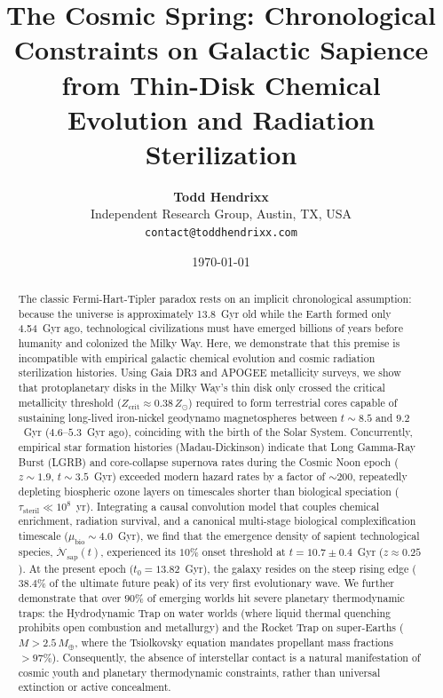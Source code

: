 \documentclass[11pt,a4paper]{article}
\title{\textbf{The Cosmic Spring: Chronological Constraints on Galactic Sapience from Thin-Disk Chemical Evolution and Radiation Sterilization}}
\author{
  \textbf{Todd Hendrixx}\\
  \small Independent Research Group, Austin, TX, USA\\
  \small \texttt{contact@toddhendrixx.com}
}
\date{\today}
\begin{document}
\maketitle

\begin{abstract}
The classic Fermi-Hart-Tipler paradox rests on an implicit chronological assumption: because the universe is approximately 13.8~Gyr old while the Earth formed only 4.54~Gyr ago, technological civilizations must have emerged billions of years before humanity and colonized the Milky Way. Here, we demonstrate that this premise is incompatible with empirical galactic chemical evolution and cosmic radiation sterilization histories. Using Gaia DR3 and APOGEE metallicity surveys, we show that protoplanetary disks in the Milky Way's thin disk only crossed the critical metallicity threshold ($Z_{\mathrm{crit}} \approx 0.38\,Z_\odot$) required to form terrestrial cores capable of sustaining long-lived iron-nickel geodynamo magnetospheres between $t \sim 8.5$ and $9.2$~Gyr ($4.6\text{--}5.3$~Gyr ago), coinciding with the birth of the Solar System. Concurrently, empirical star formation histories (Madau-Dickinson) indicate that Long Gamma-Ray Burst (LGRB) and core-collapse supernova rates during the Cosmic Noon epoch ($z \sim 1.9$, $t \sim 3.5$~Gyr) exceeded modern hazard rates by a factor of $\sim 200$, repeatedly depleting biospheric ozone layers on timescales shorter than biological speciation ($\tau_{\mathrm{steril}} \ll 10^8$~yr). Integrating a causal convolution model that couples chemical enrichment, radiation survival, and a canonical multi-stage biological complexification timescale ($\mu_{\mathrm{bio}} \sim 4.0$~Gyr), we find that the emergence density of sapient technological species, $\dot{\mathcal{N}}_{\mathrm{sap}}(t)$, experienced its $10\%$ onset threshold at $t = 10.7 \pm 0.4$~Gyr ($z \approx 0.25$). At the present epoch ($t_0 = 13.82$~Gyr), the galaxy resides on the steep rising edge ($38.4\%$ of the ultimate future peak) of its very first evolutionary wave. We further demonstrate that over $90\%$ of emerging worlds hit severe planetary thermodynamic traps: the Hydrodynamic Trap on water worlds (where liquid thermal quenching prohibits open combustion and metallurgy) and the Rocket Trap on super-Earths ($M > 2.5\,M_\oplus$, where the Tsiolkovsky equation mandates propellant mass fractions $>97\%$). Consequently, the absence of interstellar contact is a natural manifestation of cosmic youth and planetary thermodynamic constraints, rather than universal extinction or active concealment.
\end{abstract}
\end{document}
